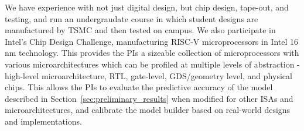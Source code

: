 \color{red}
We have experience with not just digital design, but chip design,
tape-out, and testing, and run an undergraudate course in which student designs
are manufactured by TSMC and then tested on campus.  We also participate
in Intel's Chip Design Challenge, manufacturing RISC-V microprocessors in Intel
16 nm technology. This provides the PIs a sizeable collection of
microprocessors with various microarchitectures which can be profiled at
multiple levels of abstraction - high-level microarchitecture, RTL, gate-level,
GDS/geometry level, and physical chips. This allows the PIs to evaluate the
predictive accuracy of the model described in
Section~\ref{sec:preliminary_results} when modified for other ISAs and
microarchitectures, and calibrate the model builder based on real-world designs
and implementations.
\color{black}
